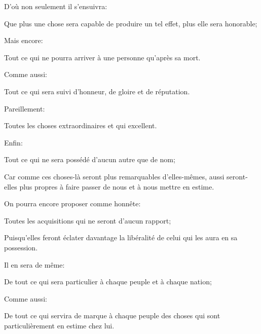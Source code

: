 D'où non seulement il s'ensuivra:

\begin{lieu}
	Que plus une chose sera capable de produire un tel effet, plus elle sera honorable;
\end{lieu}

Mais encore:

\begin{lieu}
	Tout ce qui ne pourra arriver à une personne qu'après sa mort.
\end{lieu}

Comme aussi:

\begin{lieu}
	Tout ce qui sera suivi d'honneur, de gloire et de réputation.
\end{lieu}

Pareillement:

\begin{lieu}
	Toutes les choses extraordinaires et qui excellent.
\end{lieu}

Enfin:

\begin{lieu}
	Tout ce qui ne sera possédé d'aucun autre que de nom;
\end{lieu}

Car comme ces choses-là seront plus remarquables d'elles-mêmes, aussi seront-elles plus propres à faire
passer de nous et à nous mettre en estime.

\bigbreak

On pourra encore proposer comme honnête:

\begin{lieu}
	Toutes les acquisitions qui ne seront d'aucun rapport;
\end{lieu}

Puisqu'elles feront éclater davantage la libéralité de celui qui les aura en sa possession.

\bigbreak

Il en sera de même:

\begin{lieu}
	De tout ce qui sera particulier à chaque peuple et à chaque nation;
\end{lieu}

Comme aussi:

\begin{lieu}
	De tout ce qui servira de marque à chaque peuple des choses qui sont particulièrement en estime chez lui.
\end{lieu}


